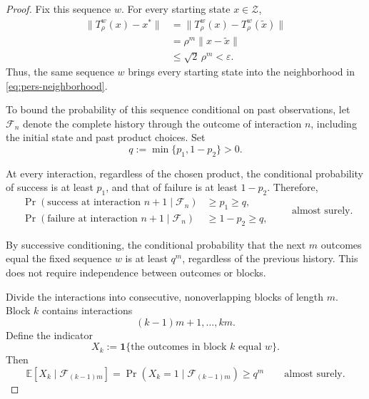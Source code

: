 \documentclass[11pt]{article}
\begin{document}
\begin{proof}
Fix this sequence $w$.
For every starting state $x\in\mathcal Z$,
\begin{equation}
\label{eq:pers-word}
\begin{aligned}
\|T_\rho^w(x)-x^*\|
&=\|T_\rho^w(x)-T_\rho^w(\widetilde x)\|\\
&=\rho^m\|x-\widetilde x\|\\
&\le\sqrt{2}\,\rho^m<\varepsilon.
\end{aligned}
\end{equation}
Thus, the same sequence $w$ brings every starting state into
the neighborhood in \eqref{eq:pers-neighborhood}.

To bound the probability of this sequence conditional on past
observations, let $\mathcal F_n$ denote the complete history
through the outcome of interaction $n$, including the initial
state and past product choices.
Set
\begin{equation*}
q:=\min\{p_1,1-p_2\}>0.
\end{equation*}

At every interaction, regardless of the chosen product,
the conditional probability of success is at least $p_1$,
and that of failure is at least $1-p_2$.
Therefore,
\begin{equation*}
\begin{aligned}
\Pr(\text{success at interaction }n+1\mid\mathcal F_n)
&\ge p_1\ge q,\\
\Pr(\text{failure at interaction }n+1\mid\mathcal F_n)
&\ge1-p_2\ge q,
\end{aligned}
\qquad\text{almost surely}.
\end{equation*}

By successive conditioning, the conditional probability that
the next $m$ outcomes equal the fixed sequence $w$ is at least
$q^m$, regardless of the previous history.
This does not require independence between outcomes or blocks.

Divide the interactions into consecutive, nonoverlapping blocks
of length $m$.
Block $k$ contains interactions
\begin{equation*}
(k-1)m+1,\ldots,km.
\end{equation*}
Define the indicator
\begin{equation*}
X_k
:=\mathbf 1\{
\text{the outcomes in block }k\text{ equal }w
\}.
\end{equation*}
Then
\begin{equation}
\label{eq:pers-block-bound}
\mathbb E[X_k\mid\mathcal F_{(k-1)m}]
=\Pr(X_k=1\mid\mathcal F_{(k-1)m})
\ge q^m
\qquad\text{almost surely}.
\end{equation}


\end{proof}
\end{document}
